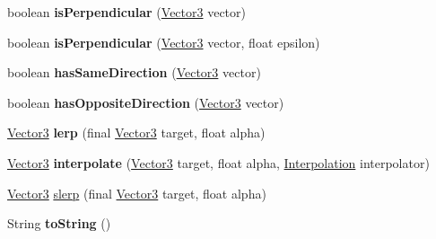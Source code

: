 \begin{DoxyCompactItemize}
\item 
\hypertarget{classairhockeyjava_1_1util_1_1_vector3_a8bc46fbe9587aaec764d58ac7d82c044}{}boolean {\bfseries is\+Perpendicular} (\hyperlink{classairhockeyjava_1_1util_1_1_vector3}{Vector3} vector)\label{classairhockeyjava_1_1util_1_1_vector3_a8bc46fbe9587aaec764d58ac7d82c044}

\item 
\hypertarget{classairhockeyjava_1_1util_1_1_vector3_afb830867a155aa4da4bf53cb5e10fd76}{}boolean {\bfseries is\+Perpendicular} (\hyperlink{classairhockeyjava_1_1util_1_1_vector3}{Vector3} vector, float epsilon)\label{classairhockeyjava_1_1util_1_1_vector3_afb830867a155aa4da4bf53cb5e10fd76}

\item 
\hypertarget{classairhockeyjava_1_1util_1_1_vector3_ad0dcd6f02639d17e558820d130b0b554}{}boolean {\bfseries has\+Same\+Direction} (\hyperlink{classairhockeyjava_1_1util_1_1_vector3}{Vector3} vector)\label{classairhockeyjava_1_1util_1_1_vector3_ad0dcd6f02639d17e558820d130b0b554}

\item 
\hypertarget{classairhockeyjava_1_1util_1_1_vector3_a7ad2adebdc3bd70422dc012a322f64a7}{}boolean {\bfseries has\+Opposite\+Direction} (\hyperlink{classairhockeyjava_1_1util_1_1_vector3}{Vector3} vector)\label{classairhockeyjava_1_1util_1_1_vector3_a7ad2adebdc3bd70422dc012a322f64a7}

\item 
\hypertarget{classairhockeyjava_1_1util_1_1_vector3_a304c2c1fa1091328e6aebe7618f32e7f}{}\hyperlink{classairhockeyjava_1_1util_1_1_vector3}{Vector3} {\bfseries lerp} (final \hyperlink{classairhockeyjava_1_1util_1_1_vector3}{Vector3} target, float alpha)\label{classairhockeyjava_1_1util_1_1_vector3_a304c2c1fa1091328e6aebe7618f32e7f}

\item 
\hypertarget{classairhockeyjava_1_1util_1_1_vector3_a1737a69473fedab5c8803fdded4531cf}{}\hyperlink{classairhockeyjava_1_1util_1_1_vector3}{Vector3} {\bfseries interpolate} (\hyperlink{classairhockeyjava_1_1util_1_1_vector3}{Vector3} target, float alpha, \hyperlink{classairhockeyjava_1_1util_1_1_interpolation}{Interpolation} interpolator)\label{classairhockeyjava_1_1util_1_1_vector3_a1737a69473fedab5c8803fdded4531cf}

\item 
\hyperlink{classairhockeyjava_1_1util_1_1_vector3}{Vector3} \hyperlink{classairhockeyjava_1_1util_1_1_vector3_ae223e21d500dc96b83d6fb8371d9a191}{slerp} (final \hyperlink{classairhockeyjava_1_1util_1_1_vector3}{Vector3} target, float alpha)
\item 
\hypertarget{classairhockeyjava_1_1util_1_1_vector3_a317659c15ff3a1a09a24a3fc47d90872}{}String {\bfseries to\+String} ()\label{classairhockeyjava_1_1util_1_1_vector3_a317659c15ff3a1a09a24a3fc47d90872}


\end{DoxyCompactItemize}
